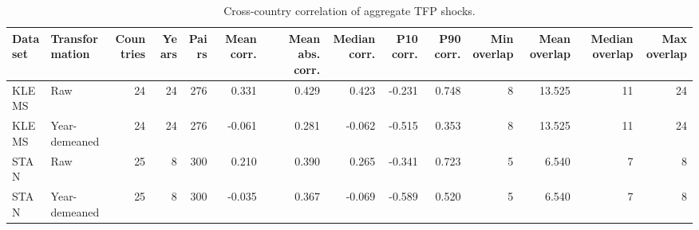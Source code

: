 \begin{table}[!htbp]
\centering
\caption{Cross-country correlation of aggregate TFP shocks.}
\label{tab:tfp-country-correlation-summary}
\begin{tabular}{llrrrrrrrrrrrr}
\hline
Dataset & Transformation & Countries & Years & Pairs & Mean corr. & Mean abs. corr. & Median corr. & P10 corr. & P90 corr. & Min overlap & Mean overlap & Median overlap & Max overlap \\
\hline
KLEMS & Raw & 24 & 24 & 276 & 0.331 & 0.429 & 0.423 & -0.231 & 0.748 & 8 & 13.525 & 11 & 24 \\
KLEMS & Year-demeaned & 24 & 24 & 276 & -0.061 & 0.281 & -0.062 & -0.515 & 0.353 & 8 & 13.525 & 11 & 24 \\
STAN & Raw & 25 & 8 & 300 & 0.210 & 0.390 & 0.265 & -0.341 & 0.723 & 5 & 6.540 & 7 & 8 \\
STAN & Year-demeaned & 25 & 8 & 300 & -0.035 & 0.367 & -0.069 & -0.589 & 0.520 & 5 & 6.540 & 7 & 8 \\
\hline
\end{tabular}
\end{table}
